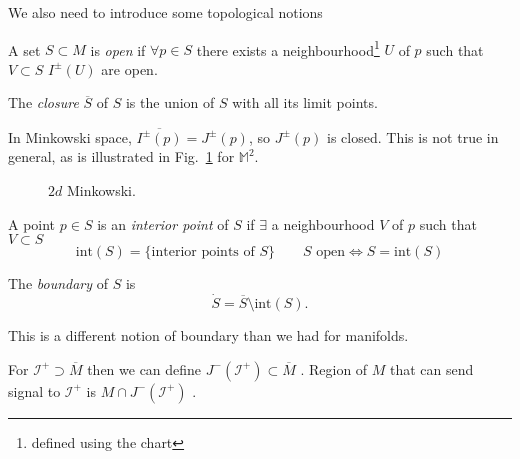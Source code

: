 We also need to introduce some topological notions
\begin{definition}[open]
  A set $S \subset M$ is \emph{open} if $\forall p \in S$ there exists a neighbourhood\footnote{defined using the chart} $U$ of $p$ such that $V \subset S$ $I^{\pm}(U)$ are open.
\end{definition}
\begin{definition}[closure]
  The \emph{closure} $\overline{S}{}$ of $S$ is the union of $S$ with all its limit points.
\end{definition}
\begin{example}[Mink]
  In Minkowski space, $\overline{I^{\pm}(p)}{} = J^{\pm}(p)$, so $J^{\pm}(p)$ is closed.
  This is not true in general, as is illustrated in Fig.~\ref{fig:l12f2} for $\mathbb{M}^2$.
\end{example}
\begin{figure}[tbhp]
  \centering
  \def\svgwidth{0.4\columnwidth}
  
  \caption{$2d$ Minkowski.}
  \label{fig:l12f2}
\end{figure}

\begin{definition}
  A point $p \in S$ is an \emph{interior point} of $S$ if $\exists$ a neighbourhood $V$ of $p$ such that $V \subset S$
  \begin{equation}
    \text{int}(S) = \{\text{interior points of } S\} \qquad S \text{ open} \iff S = \text{int}(S)
  \end{equation}
\end{definition}
\begin{definition}[boundary]
  The \emph{boundary} of $S$ is
  \begin{equation}
    \dot{S} = \overline{S}{} \setminus \text{int}(S).
  \end{equation}
\end{definition}
\begin{remark}
  This is a different notion of boundary than we had for manifolds. 
\end{remark}

For $\mathscr{I}^+ \supset \overline{M}{}$  then we can define $J^- (\mathscr{I}^+) \subset \overline{M}{}$ . 
Region of $M$ that can send signal to  $\mathscr{I}^+$  is $M \cap J^- (\mathscr{I}^+)$ .

